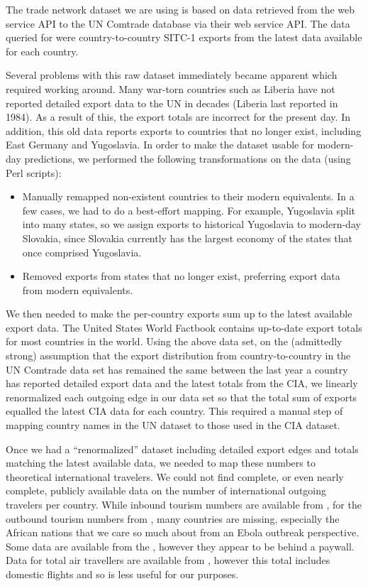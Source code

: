 \documentclass[10pt, journal,onecolumn]{IEEEtran}
\begin{document}
The trade network dataset we are using is based on data retrieved from the web service API to the
UN Comtrade database \citep{uncomtradedata} via their web service API.
The data queried for were country-to-country SITC-1 exports from the latest data available
for each country.

Several problems with this raw dataset immediately became apparent which required working around.
Many war-torn countries such as Liberia have not reported detailed export data
to the UN in decades (Liberia last reported in 1984). As a result of this, the export totals
are incorrect for the present day. In addition, this old data reports exports to countries that
no longer exist, including East Germany and Yugoslavia. In order to make the dataset usable for
modern-day predictions, we performed the following transformations on the data (using Perl scripts):

\begin{itemize}
\item Manually remapped non-existent countries to their modern equivalents.
      In a few cases, we had to do a best-effort mapping. For example, Yugoslavia split into many
      states, so we assign exports to historical Yugoslavia to modern-day Slovakia,
      since Slovakia currently has the largest economy of the states that once comprised Yugoslavia.
\item Removed exports from states that no longer exist, preferring export data from
      modern equivalents.
\end{itemize}

We then needed to make the per-country exports sum up to the latest available export data.
The United States \cite{ciatotalexports} World Factbook contains up-to-date export totals
for most countries in the world. Using the above data set, on the (admittedly strong) assumption
that the export distribution
from country-to-country in the UN Comtrade data set has remained the same between the last year a
country has reported detailed export data and the latest totals from the CIA, we linearly renormalized
each outgoing edge in our data set so that the total sum of exports equalled the latest CIA data
for each country.
This required a manual step of mapping country names in the UN dataset to those used in
the CIA dataset.

Once we had a ``renormalized'' dataset including detailed export edges and totals matching
the latest available data, we needed to map these numbers to theoretical international travelers.
We could not find complete, or even nearly complete, publicly available data on the number of
international outgoing travelers per country. While inbound tourism numbers are available from
\cite{worldbankinboundtourism}, for the outbound tourism numbers from \cite{worldbankoutboundtourism},
many countries are missing,
especially the African nations that we care so much about from an Ebola outbreak perspective.
Some data are available from the \cite{unwtooutboundtourism}, however they appear to be behind a paywall.
Data for total air travellers are available from \cite{worldbankairpassengers},
however this total includes domestic flights and so is less useful for our purposes.
\end{document}
